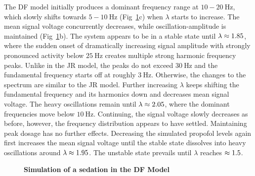     The DF model initially produces a dominant frequency range at $10-20 \SI{}{\hertz} $,
    which slowly shifts towards $ 5-10 \SI{}{\hertz} $ (Fig~\ref{fig:sedation_sim_df}c) when $\lambda$ starts to increase.
    The mean signal voltage concurrently decreases,
    while oscillation-amplitude is maintained (Fig~\ref{fig:sedation_sim_df}b).
    The system appears to be in a stable state until $ \lambda \approx 1.85 $,
    where the sudden onset of dramatically
    increasing signal amplitude with strongly pronounced activity below $ \SI{25}{\hertz} $
    creates multiple strong harmonic frequency peaks.
    Unlike in the JR model, the peaks do not exceed  $ \SI{30}{\hertz} $ and the fundamental frequency starts off
    at roughly $\SI{3}{\hertz}$.
    Otherwise, the changes to the spectrum are similar to the JR model.
    Further increasing $\lambda$ keeps shifting the fundamental frequency and its harmonics down
    and decreases mean signal voltage.
    The heavy oscillations remain until $\lambda \approx 2.05 $,
    where the dominant frequencies move below $\SI{10}{\hertz}$.
    Continuing, the signal voltage slowly decreases as before,
    however, the frequency distribution appears to have settled.
    Maintaining peak dosage has no further effects.
    Decreasing the simulated propofol levels again first increases the mean signal voltage
    until the stable state dissolves into heavy oscillations around $\lambda \approx 1.95$.
    The unstable state prevails until $\lambda$ reaches $\approx 1.5$.


\begin{figure}[H]

\caption{\textbf{Simulation of a sedation in the DF Model}
}\label{fig:sedation_sim_df}
\end{figure}

